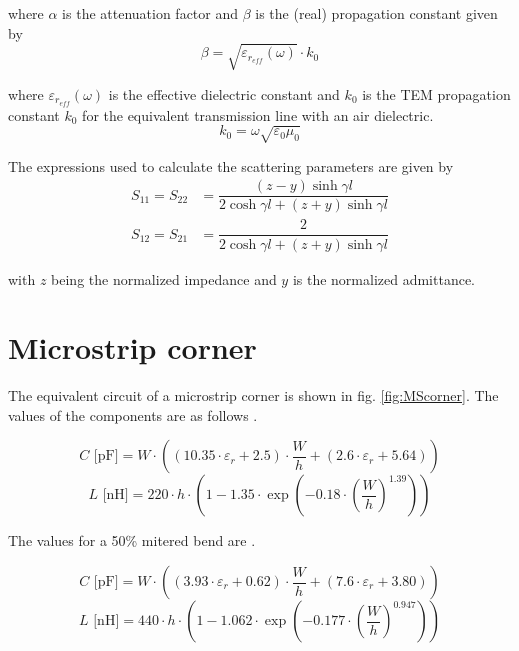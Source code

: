 \documentclass[10pt]{report}
\begin{document}
where $\alpha$ is the attenuation factor and $\beta$ is the (real)
propagation constant given by
\begin{equation}
\beta = \sqrt{\varepsilon_{r_{eff}}(\omega)} \cdot k_0
\end{equation}

where $\varepsilon_{r_{eff}}(\omega)$ is the effective dielectric
constant and $k_0$ is the TEM propagation constant $k_0$ for the
equivalent transmission line with an air dielectric.
\begin{equation}
k_0 = \omega \sqrt{\varepsilon_0 \mu_0}
\end{equation}

The expressions used to calculate the scattering parameters are given
by
\begin{align}
S_{11} = S_{22} &= \dfrac{\left(z - y\right) \sinh{\gamma l}}{2\cosh{\gamma l} + \left(z + y\right) \sinh{\gamma l}}\\
S_{12} = S_{21} &= \dfrac{2}{2\cosh{\gamma l} + \left(z + y\right) \sinh{\gamma l}}
\end{align}

with $z$ being the normalized impedance and $y$ is the normalized
admittance.

\section{Microstrip corner}

The equivalent circuit of a microstrip corner is shown in fig.
\ref{fig:MScorner}. The values of the components are as follows
\cite{Kirschning4}.

\begin{equation}
C \text{ [pF]} = W \cdot \left( (10.35\cdot\varepsilon_r + 2.5) \cdot \frac{W}{h} +
			       (2.6\cdot\varepsilon_r + 5.64) \right)
\end{equation}
\begin{equation}
L \text{ [nH]} = 220\cdot h \cdot \left( 1 - 1.35\cdot\exp\left( -0.18\cdot
		   \left( \frac{W}{h} \right)^{1.39} \right) \right)
\end{equation}

The values for a 50\% mitered bend are \cite{Kirschning4}.

\begin{equation}
C \text{ [pF]} = W \cdot \left( (3.93\cdot\varepsilon_r + 0.62) \cdot \frac{W}{h} +
			       (7.6\cdot\varepsilon_r + 3.80) \right)
\end{equation}
\begin{equation}
L \text{ [nH]} = 440\cdot h \cdot \left( 1 - 1.062\cdot\exp\left( -0.177\cdot
		   \left( \frac{W}{h} \right)^{0.947} \right) \right)
\end{equation}
\end{document}
